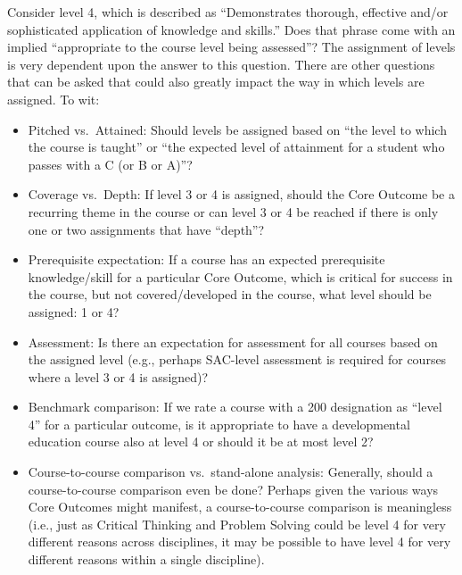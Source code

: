Consider level 4, which is described as ``Demonstrates thorough, effective
and/or sophisticated application
of knowledge and skills.''  Does that phrase come with an implied ``appropriate
to the course level being assessed''?  The assignment of levels is very
dependent upon the answer to this question.  There are other questions that can
be asked that could also greatly impact the way in which levels are assigned.
To wit:
\begin{itemize}
\item Pitched vs.\ Attained: Should levels be assigned based on ``the level to
  which the course is taught'' or ``the expected level of attainment for a
  student who passes with a C (or B or A)''?

\item Coverage vs.\ Depth: If level 3 or 4 is assigned, should the Core Outcome
  be a recurring theme in the course or can level 3 or 4 be reached if there is
  only one or two assignments that have ``depth''?

\item Prerequisite expectation: If a course has an expected prerequisite
  knowledge/skill for a particular Core Outcome, which is critical for success
  in the course, but not covered/developed in the course, what level should be
  assigned: 1 or 4?

\item Assessment: Is there an expectation for assessment for all courses based
  on the assigned level (e.g., perhaps SAC-level assessment is required for
  courses where a level 3 or 4 is assigned)?

\item Benchmark comparison: If we rate a course with a 200 designation as
  ``level 4'' for a particular outcome, is it appropriate to have a
  developmental education course also at level 4 or should it be at most level
  2?

\item Course-to-course comparison vs.\ stand-alone analysis: Generally, should
  a course-to-course comparison even be done? Perhaps given the various ways
  Core Outcomes might manifest, a course-to-course comparison is meaningless
  (i.e., just as Critical Thinking and Problem Solving could be level 4 for
  very different reasons across disciplines, it may be possible to have level 4
  for very different reasons within a single discipline).
\end{itemize}


